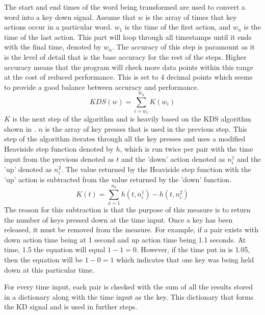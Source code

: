 \documentclass[10pt,a4paper]{report}
\begin{document}
The start and end times of the word being transformed are used to convert a word into a key down signal. Assume that \(w\) is the array of times that key actions occur in a particular word. \(w_1\) is the time of the first action, and \(w_n\) is the time of the last action. This part will loop through all timestamps until it ends with the final time, denoted by \(w_n\). The accuracy of this step is paramount as it is the level of detail that is the base accuracy for the rest of the steps. Higher accuracy means that the program will check more data points within this range at the cost of reduced performance. This is set to 4 decimal points which seems to provide a good balance between accuracy and performance.
\begin{equation}
\textit{KDS}(w) = \sum^{w_n}_{i=w_1}K(w_i)
\end{equation}
\(K\) is the next step of the algorithm and is heavily based on the KDS algorithm shown in \cite{ToosiRamin2021Taok}. \(n\) is the array of key presses that is used in the previous step. This step of the algorithm iterates through all the key presses and uses a modified Heaviside step function denoted by \(h\), which is run twice per pair with the time input from the previous denoted as \(t\) and the 'down' action denoted as \(n_i^1\) and the 'up' denoted as \(n_i^2\). The value returned by the Heaviside step function with the 'up' action is subtracted from the value returned by the 'down' function.
\begin{equation}
\textit{K}(t) = \sum^{n_k}_{x=1}h(t,n_i^1)-h(t,n_i^2)
\end{equation}
The reason for this subtraction is that the purpose of this measure is to return the number of keys pressed down at the time input. Once a key has been released, it must be removed from the measure. For example, if a pair exists with down action time being at 1 second and up action time being 1.1 seconds. At time, 1.5 the equation will equal \(1-1=0\). However, if the time put in is 1.05, then the equation will be \(1-0=1\) which indicates that one key was being held down at this particular time.

For every time input, each pair is checked with the sum of all the results stored in a dictionary along with the time input as the key. This dictionary that forms the KD signal and is used in further steps.
\end{document}
